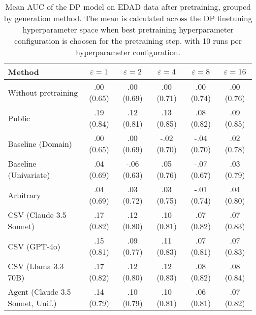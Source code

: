 \begin{table}[h!]
    \centering
    \caption{Mean AUC of the DP model on EDAD data after pretraining, grouped by generation method. The mean is calculated across the DP finetuning hyperparameter space when best pretraining hyperparameter configuration is choosen for the pretraining step, with 10 runs per hyperparameter configuration.}
    \label{tab:epsilon_comparison}
    \begin{tabular}{lccccc}
    \toprule
    Method & $\varepsilon=1$ & $\varepsilon=2$ & $\varepsilon=4$ & $\varepsilon=8$ & $\varepsilon=16$ \\
    \midrule
    Without pretraining & .00 {\small (0.65)} & .00 {\small (0.69)} & .00 {\small (0.71)} & .00 {\small (0.74)} & .00 {\small (0.76)} \\
    \arrayrulecolor{black!50!}\midrule
    Public & \cellcolor{gold!30}.19 {\small (0.84)} & \cellcolor{gold!30}.12 {\small (0.81)} & \cellcolor{gold!30}.13 {\small (0.85)} & \cellcolor{gold!30}.08 {\small (0.82)} & \cellcolor{gold!30}.09 {\small (0.85)} \\
    \arrayrulecolor{black!50!}\midrule
    Baseline (Domain) & .00 {\small (0.65)} & .00 {\small (0.69)} & -.02 {\small (0.70)} & -.04 {\small (0.70)} & .02 {\small (0.78)} \\
    Baseline (Univariate) & .04 {\small (0.69)} & -.06 {\small (0.63)} & .05 {\small (0.76)} & -.07 {\small (0.67)} & .03 {\small (0.79)} \\
    \arrayrulecolor{black!50!}\midrule
    Arbitrary & .04 {\small (0.69)} & .03 {\small (0.72)} & .03 {\small (0.75)} & -.01 {\small (0.74)} & .04 {\small (0.80)} \\
    \arrayrulecolor{black!50!}\midrule
    CSV (Claude 3.5 Sonnet) & \cellcolor{silver!30}.17 {\small (0.82)} & \cellcolor{silver!30}.12 {\small (0.80)} & .10 {\small (0.81)} & \cellcolor{silver!30}.07 {\small (0.82)} & .07 {\small (0.83)} \\
    CSV (GPT-4o) & .15 {\small (0.81)} & .09 {\small (0.77)} & .11 {\small (0.83)} & \cellcolor{bronze!30}.07 {\small (0.81)} & .07 {\small (0.83)} \\
    CSV (Llama 3.3 70B) & \cellcolor{bronze!30}.17 {\small (0.82)} & \cellcolor{bronze!30}.12 {\small (0.80)} & \cellcolor{bronze!30}.12 {\small (0.83)} & \cellcolor{gold!30}.08 {\small (0.82)} & \cellcolor{bronze!30}.08 {\small (0.84)} \\
    \arrayrulecolor{black!50!}\midrule
    Agent (Claude 3.5 Sonnet, Unif.) & .14 {\small (0.79)} & .10 {\small (0.79)} & .10 {\small (0.81)} & .06 {\small (0.81)} & .07 {\small (0.82)} \\

\end{tabular}
\end{table}
